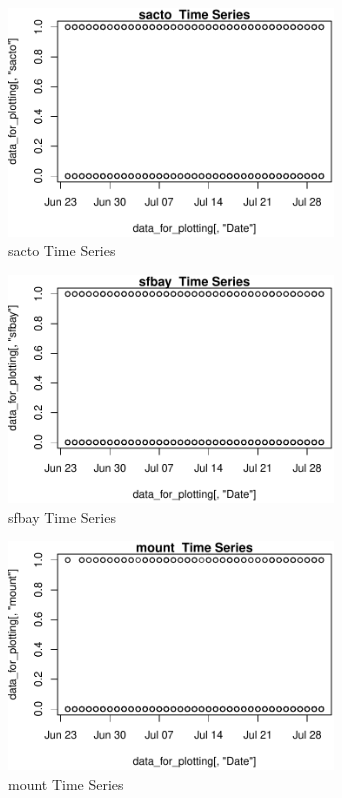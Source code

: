 \begin{figure} 
\centering  
\includegraphics[width=0.77\textwidth]{Code_Outputs/ML_input_report_AllforCaret_cleaned_StepPractice_part_practice_sactoTS.pdf} 
\caption{\label{fig:ML_input_report_AllforCaret_cleaned_StepPractice_part_practicesactoTS}sacto  Time Series} 
\end{figure} 
 

\begin{figure} 
\centering  
\includegraphics[width=0.77\textwidth]{Code_Outputs/ML_input_report_AllforCaret_cleaned_StepPractice_part_practice_sfbayTS.pdf} 
\caption{\label{fig:ML_input_report_AllforCaret_cleaned_StepPractice_part_practicesfbayTS}sfbay  Time Series} 
\end{figure} 
 

\begin{figure} 
\centering  
\includegraphics[width=0.77\textwidth]{Code_Outputs/ML_input_report_AllforCaret_cleaned_StepPractice_part_practice_mountTS.pdf} 
\caption{\label{fig:ML_input_report_AllforCaret_cleaned_StepPractice_part_practicemountTS}mount  Time Series} 
\end{figure} 
 

